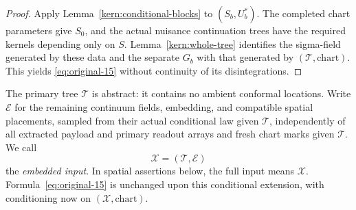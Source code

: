 \begin{proof}
Apply Lemma~\ref{kern:conditional-blocks} to $(S_b,U_b^*)$. The completed
chart parameters give $S_0$, and the actual nuisance continuation trees have
the required kernels depending only on $S$. Lemma~\ref{kern:whole-tree}
identifies the sigma-field generated by these data and the separate $G_b$
with that generated by $(\mathcal T,\text{chart})$. This yields
\eqref{eq:original-15} without continuity of its disintegrations.
\end{proof}

The primary tree $\mathcal T$ is abstract: it contains no ambient conformal
locations. Write $\mathcal E$ for the remaining continuum fields, embedding,
and compatible spatial placements, sampled from their actual conditional law
given $\mathcal T$, independently of all extracted payload and primary
readout arrays and fresh chart marks given $\mathcal T$. We call
\[
 \mathcal X=(\mathcal T,\mathcal E)
\]
the \emph{embedded input}. In spatial assertions below, the full input means
$\mathcal X$. Formula~\eqref{eq:original-15} is unchanged upon this conditional
extension, with conditioning now on $(\mathcal X,\text{chart})$.

